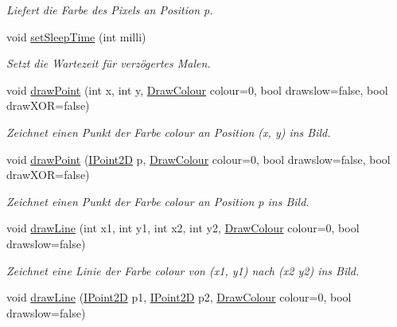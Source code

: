 \begin{DoxyCompactItemize}
\begin{DoxyCompactList}\small\item\em Liefert die Farbe des Pixels an Position {\ttfamily p}. \end{DoxyCompactList}\item 
void \mbox{\hyperlink{classDrawing_a34754d4f4d6e129dae03f058d76dd43f}{set\+Sleep\+Time}} (int milli)
\begin{DoxyCompactList}\small\item\em Setzt die Wartezeit für verzögertes Malen. \end{DoxyCompactList}\item 
void \mbox{\hyperlink{classDrawing_a482d8231afa23d444084a30c94cd5252}{draw\+Point}} (int x, int y, \mbox{\hyperlink{classDrawColour}{Draw\+Colour}} colour=0, bool drawslow=false, bool draw\+X\+OR=false)
\begin{DoxyCompactList}\small\item\em Zeichnet einen Punkt der Farbe {\ttfamily colour} an Position ({\ttfamily x}, {\ttfamily y}) ins Bild. \end{DoxyCompactList}\item 
void \mbox{\hyperlink{classDrawing_ace204fccbe188a6b9e8d524cc243f005}{draw\+Point}} (\mbox{\hyperlink{point2d_8h_aeeeb57e4186edb0a4274b64925e0d0fb}{I\+Point2D}} p, \mbox{\hyperlink{classDrawColour}{Draw\+Colour}} colour=0, bool drawslow=false, bool draw\+X\+OR=false)
\begin{DoxyCompactList}\small\item\em Zeichnet einen Punkt der Farbe {\ttfamily colour} an Position {\ttfamily p} ins Bild. \end{DoxyCompactList}\item 
void \mbox{\hyperlink{classDrawing_a80093353d917a5f15ba631eeb546d97c}{draw\+Line}} (int x1, int y1, int x2, int y2, \mbox{\hyperlink{classDrawColour}{Draw\+Colour}} colour=0, bool drawslow=false)
\begin{DoxyCompactList}\small\item\em Zeichnet eine Linie der Farbe {\ttfamily colour} von ({\ttfamily x1}, {\ttfamily y1}) nach ({\ttfamily x2} {\ttfamily y2}) ins Bild. \end{DoxyCompactList}\item 
void \mbox{\hyperlink{classDrawing_aee26a121d00e5ba0317c4280cb07e3bf}{draw\+Line}} (\mbox{\hyperlink{point2d_8h_aeeeb57e4186edb0a4274b64925e0d0fb}{I\+Point2D}} p1, \mbox{\hyperlink{point2d_8h_aeeeb57e4186edb0a4274b64925e0d0fb}{I\+Point2D}} p2, \mbox{\hyperlink{classDrawColour}{Draw\+Colour}} colour=0, bool drawslow=false)

\end{DoxyCompactItemize}
